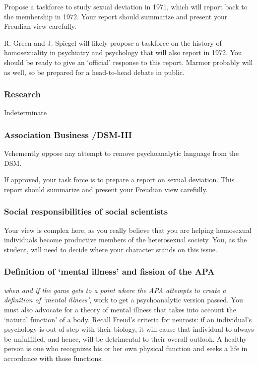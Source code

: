 \begin{refsection}
Propose a taskforce to study sexual deviation in 1971, which will report back to the membership in 1972. Your report should summarize and present your Freudian view carefully.

R. Green and J. Spiegel will likely propose a taskforce on the history of homosexuality in psychiatry and psychology that will also report in 1972. You should be ready to give an `official' response to this report. Marmor probably will as well, so be prepared for a head-to-head debate in public.

\subsubsection{Research}
\label{research}

Indeterminate

\subsubsection{Association Business \slash  DSM-III}
\label{associationbusinessdsm-iii}

Vehemently oppose any attempt to remove psychoanalytic language from the DSM.

\begin{writingtask}[Socarides]\label{writingtask:socarides}
If approved, your task force is to prepare a report on sexual deviation. This report should summarize and present your Freudian view carefully.
\end{writingtask}

\subsubsection{Social responsibilities of social scientists}
\label{socialresponsibilitiesofsocialscientists}

Your view is complex here, as you really believe that you are helping homosexual individuals become productive members of the heterosexual society. You, as the student, will need to decide where your character stands on this issue.

\subsubsection{Definition of ‘mental illness’ and fission of the APA}
\label{definitionof‘mentalillness’andfissionoftheapa}

\emph{when and if the game gets to a point where the APA attempts to create a definition of ‘mental illness’}, work to get a psychoanalytic version passed. You must also advocate for a theory of mental illness that takes into account the `natural function' of a body. Recall Freud's criteria for neurosis: if an individual's psychology is out of step with their biology, it will cause that individual to always be unfulfilled, and hence, will be detrimental to their overall outlook. A healthy person is one who recognizes his or her own physical function and seeks a life in accordance with those functions.


\end{refsection}
